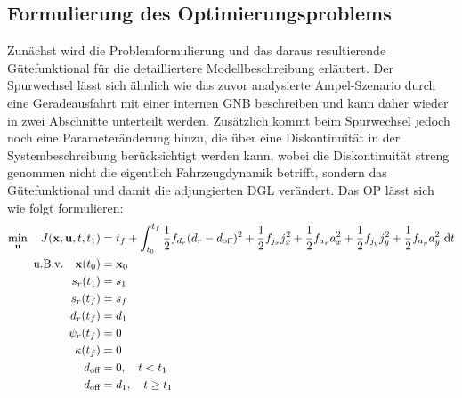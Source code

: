 \subsection{Formulierung des Optimierungsproblems}\label{subsec:Gütefunktional_Spurwechsel}
Zunächst wird die Problemformulierung und das daraus resultierende Gütefunktional für die detailliertere Modellbeschreibung erläutert. Der Spurwechsel lässt sich ähnlich wie das zuvor analysierte Ampel-Szenario durch eine Geradeausfahrt mit einer internen \gls{GNB} beschreiben und kann daher wieder in zwei Abschnitte unterteilt werden. Zusätzlich kommt beim Spurwechsel jedoch noch eine Parameteränderung hinzu, die über eine Diskontinuität in der Systembeschreibung berücksichtigt werden kann, wobei die Diskontinuität streng genommen nicht die eigentlich Fahrzeugdynamik betrifft, sondern das Gütefunktional und damit die adjungierten \gls{DGL} verändert. Das \gls{OP} lässt sich wie folgt formulieren:
\begin{align}
\min_{\boldsymbol{\mathrm{u}}} \quad J(\boldsymbol{\mathrm{x}},\boldsymbol{\mathrm{u}},t,t_1) &= t_f + \int_{t_0}^{t_f}\frac{1}{2}f_{d_r}(d_r - d_{\textrm{off}})^2 + \frac{1}{2}f_{j_x} j_x^2 + \frac{1}{2}f_{a_x} a_x^2 + \frac{1}{2}f_{j_y} j_y^2 + \frac{1}{2}f_{a_y} a_y^2~\textrm{d}{t} \\
\textrm{u.B.v.} \quad \boldsymbol{\mathrm{x}}(t_0) &= \boldsymbol{\mathrm{x}}_0 \\
s_r(t_1) &= s_1 \\
s_r(t_f) &= s_f \\
d_r(t_f) &= d_1 \label{eq:Spurwechsel_Endbedingung_dr}\\
\psi_r(t_f) &= 0 \label{eq:Spurwechsel_Endbedingung_psir}\\
\kappa(t_f) &= 0 \label{eq:Spurwechsel_Endbedingung_kappa}\\
d_{\textrm{off}} &= 0,\quad t<t_1 \label{eq:Spurwechsel_interneGNB_dr_zero}\\
d_{\textrm{off}} &= d_1,\quad t\geq t_1 \label{eq:Spurwechsel_interneGNB_dr_d1}
\end{align}
